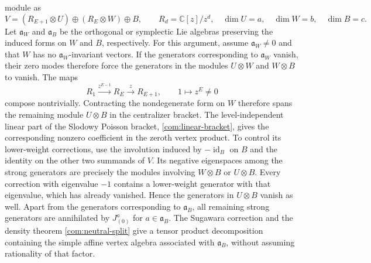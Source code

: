 \documentclass[11pt,a4paper]{amsart}
\numberwithin{equation}{section}
\theoremstyle{definition}
\theoremstyle{remark}
\newcommand{\C}{\mathbb C}
\newcommand{\id}{\operatorname{id}}
\begin{document}
module as
$$
 V=(R_{E+1}\otimes U)\oplus(R_E\otimes W)\oplus B,
 \qquad R_d=\C[z]/z^d,\quad
 \dim U=a,\quad\dim W=b,\quad\dim B=c.
$$
Let $\mathfrak a_W$ and $\mathfrak a_B$ be the orthogonal or symplectic
Lie algebras preserving the induced forms on $W$ and $B$, respectively.
For this argument, assume $\mathfrak a_W\ne0$ and that $W$ has no
$\mathfrak a_W$-invariant vectors. If the generators corresponding to
$\mathfrak a_W$ vanish, their zero modes therefore force the generators
in the modules $U\otimes W$ and $W\otimes B$ to vanish. The maps
$$
 R_1\xrightarrow{z^{E-1}}R_E\xrightarrow{z}R_{E+1},
 \qquad1\longmapsto z^E\ne0
$$
compose nontrivially. Contracting the nondegenerate form on $W$ therefore
spans the remaining module $U\otimes B$ in the centralizer bracket.
The level-independent linear part of the Slodowy Poisson bracket,
\cref{com:linear-bracket}, gives the corresponding nonzero coefficient
in the zeroth vertex product. To control its lower-weight corrections,
use the involution induced by $-\id_B$ on $B$ and the identity on the other
two summands of $V$. Its negative eigenspaces among the strong generators
are precisely the modules involving $W\otimes B$ or $U\otimes B$.
Every correction with eigenvalue $-1$ contains a lower-weight generator
with that eigenvalue, which has already vanished. Hence the generators
in $U\otimes B$ vanish as well. Apart from the generators corresponding
to $\mathfrak a_B$, all remaining strong generators are annihilated by
$J^a_{(0)}$ for $a\in\mathfrak a_B$. The Sugawara correction and the density
theorem \cref{com:neutral-split} give a tensor product decomposition
containing the simple affine vertex algebra associated with
$\mathfrak a_B$, without assuming rationality of that factor.
\end{document}
